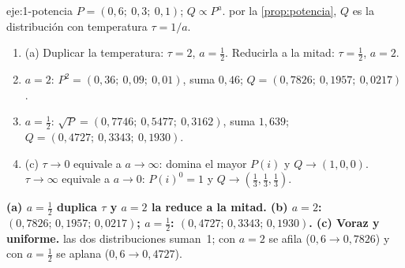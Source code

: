 \begin{solucion}{eje:1-potencia}
\datos $P=(0{,}6;\allowbreak\ 0{,}3;\allowbreak\ 0{,}1)$; $Q\propto P^{a}$.
\planteamiento por la \cref{prop:potencia}, $Q$ es la distribución con temperatura $\tau=1/a$.
\pasos
\begin{enumerate}[label=\arabic*.]
  \item (a) Duplicar la temperatura: $\tau=2$, $a=\frac12$. Reducirla a la mitad: $\tau=\frac12$, $a=2$.
  \item $a=2$: $P^{2}=(0{,}36;\allowbreak\ 0{,}09;\allowbreak\ 0{,}01)$, suma $0{,}46$; $Q=(0{,}7826;\allowbreak\ 0{,}1957;\allowbreak\ 0{,}0217)$.
  \item $a=\frac12$: $\sqrt P=(0{,}7746;\allowbreak\ 0{,}5477;\allowbreak\ 0{,}3162)$, suma $1{,}639$; $Q=(0{,}4727;\allowbreak\ 0{,}3343;\allowbreak\ 0{,}1930)$.
  \item (c) $\tau\to 0$ equivale a $a\to\infty$: domina el mayor $P(i)$ y $Q\to(1,0,0)$. $\tau\to\infty$ equivale a $a\to 0$: $P(i)^{0}=1$ y $Q\to(\frac13,\frac13,\frac13)$.
\end{enumerate}
\resultado \textbf{(a) $a=\frac12$ duplica $\tau$ y $a=2$ la reduce a la mitad. (b) $a=2$: $(0{,}7826;\allowbreak\,0{,}1957;\allowbreak\,0{,}0217)$; $a=\frac12$: $(0{,}4727;\allowbreak\,0{,}3343;\allowbreak\,0{,}1930)$. (c) Voraz y uniforme.}
\comprobacion las dos distribuciones suman~1; con $a=2$ se afila ($0{,}6\to 0{,}7826$) y con $a=\frac12$ se aplana ($0{,}6\to 0{,}4727$).
\end{solucion}

